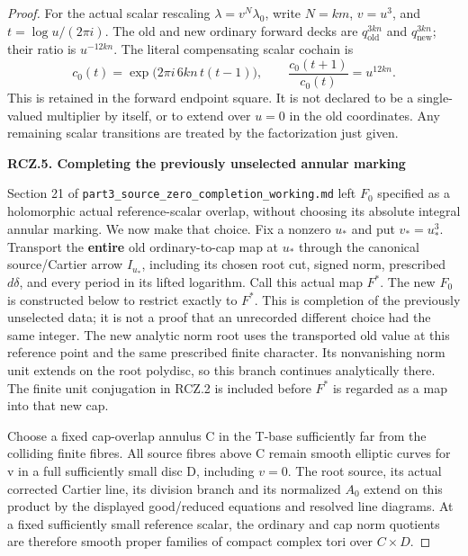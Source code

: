 \begin{proof}
For the actual scalar rescaling \(\lambda=v^N\lambda_0\),
write \(N=km\), \(v=u^3\), and
\(t=\log u/(2\pi i)\). The old and new ordinary forward decks
are \(q_{\mathrm{old}}^{3kn}\) and
\(q_{\mathrm{new}}^{3kn}\); their ratio is
\(u^{-12kn}\). The literal compensating scalar cochain is
\[
 c_0(t)=\exp\bigl(2\pi i\,6kn\,t(t-1)\bigr),
 \qquad \frac{c_0(t+1)}{c_0(t)}=u^{12kn}.
\]
This is retained in the forward endpoint square. It is not
declared to be a single-valued multiplier by itself, or to extend
over \(u=0\) in the old coordinates. Any remaining scalar transitions
are treated by the factorization just given.

\par

\medskip\noindent\textbf{RCZ.5. Completing the previously unselected annular marking}

\par\nobreak

Section 21 of \texttt{part3\_source\_zero\_completion\_working.md} left \(F_0\)
specified as a holomorphic actual reference-scalar overlap, without
choosing its absolute integral annular marking. We now make that
choice. Fix a nonzero \(u_*\) and put \(v_*=u_*^3\). Transport the \textbf{entire}
old ordinary-to-cap map at \(u_*\) through the canonical source/Cartier
arrow \(I_{u_*}\), including its chosen root cut, signed norm, prescribed
\(d\delta\), and every period in its lifted logarithm. Call this
actual map \(F^*\). The new \(F_0\) is constructed below to restrict exactly
to \(F^*\). This is completion of the previously unselected data; it is
not a proof that an unrecorded different choice had the same integer.
The new analytic norm root uses the transported old value at this
reference point and the same prescribed finite character. Its
nonvanishing norm unit extends on the root polydisc, so this branch
continues analytically there. The finite unit conjugation in RCZ.2
is included before \(F^*\) is regarded as a map into that new cap.

Choose a fixed cap-overlap annulus C in the T-base sufficiently far
from the colliding finite fibres. All source fibres above C remain
smooth elliptic curves for v in a full sufficiently small disc D,
including \(v=0\). The root source, its actual corrected Cartier line,
its division branch and its normalized \(A_0\) extend on this product by
the displayed good/reduced equations and resolved line diagrams.
At a fixed sufficiently small reference scalar, the ordinary and
cap norm quotients are therefore smooth proper families of compact
complex tori over \(C\times D\).


\end{proof}

